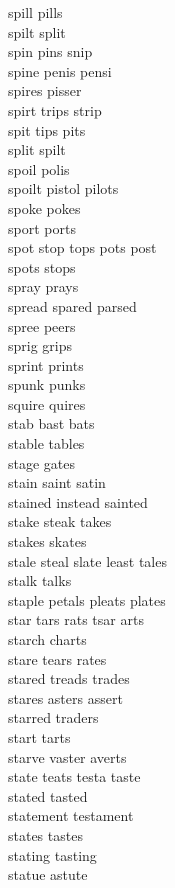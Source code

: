 spill pills\\
spilt split\\
spin pins snip\\
spine penis pensi\\
spires pisser\\
spirt trips strip\\
spit tips pits\\
split spilt\\
spoil polis\\
spoilt pistol pilots\\
spoke pokes\\
sport ports\\
spot stop tops pots post\\
spots stops\\
spray prays\\
spread spared parsed\\
spree peers\\
sprig grips\\
sprint prints\\
spunk punks\\
squire quires\\
stab bast bats\\
stable tables\\
stage gates\\
stain saint satin\\
stained instead sainted\\
stake steak takes\\
stakes skates\\
stale steal slate least tales\\
stalk talks\\
staple petals pleats plates\\
star tars rats tsar arts\\
starch charts\\
stare tears rates\\
stared treads trades\\
stares asters assert\\
starred traders\\
start tarts\\
starve vaster averts\\
state teats testa taste\\
stated tasted\\
statement testament\\
states tastes\\
stating tasting\\
statue astute\\
